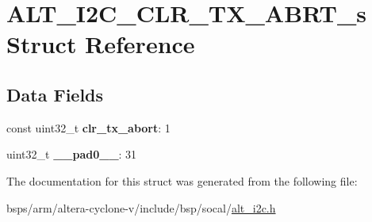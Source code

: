 \hypertarget{structALT__I2C__CLR__TX__ABRT__s}{}\section{A\+L\+T\+\_\+\+I2\+C\+\_\+\+C\+L\+R\+\_\+\+T\+X\+\_\+\+A\+B\+R\+T\+\_\+s Struct Reference}
\label{structALT__I2C__CLR__TX__ABRT__s}
\subsection*{Data Fields}
\begin{DoxyCompactItemize}
\item 
\mbox{\label{structALT__I2C__CLR__TX__ABRT__s_ae8645d022b78a1912553a09e307b3369}} 
const uint32\+\_\+t {\bfseries clr\+\_\+tx\+\_\+abort}\+: 1
\item 
\mbox{\label{structALT__I2C__CLR__TX__ABRT__s_ab3f41d029a08d6dabb8f4d8bf93feb30}} 
uint32\+\_\+t {\bfseries \+\_\+\+\_\+pad0\+\_\+\+\_\+}\+: 31
\end{DoxyCompactItemize}


The documentation for this struct was generated from the following file\+:\begin{DoxyCompactItemize}
\item 
bsps/arm/altera-\/cyclone-\/v/include/bsp/socal/\mbox{\hyperlink{socal_2alt__i2c_8h}{alt\+\_\+i2c.\+h}}\end{DoxyCompactItemize}
